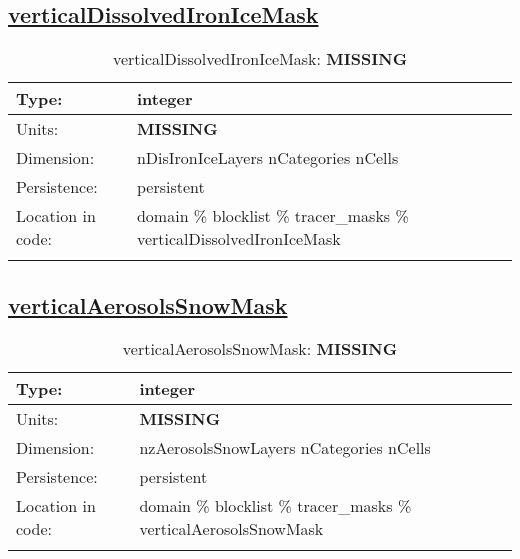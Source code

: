 \subsection[verticalDissolvedIronIceMask]{\hyperref[sec:var_tab_tracer_masks]{verticalDissolvedIronIceMask}}
\label{subsec:var_sec_tracer_masks_verticalDissolvedIronIceMask}
\begin{center}
\begin{longtable}{| p{2.0in} | p{4.0in} |}
        \hline 
        Type: & integer \\
        \hline 
        Units: & {\bf \color{red} MISSING} \\
        \hline 
        Dimension: & nDisIronIceLayers nCategories nCells \\
        \hline 
        Persistence: & persistent \\
        \hline 
         Location in code: & domain \% blocklist \% tracer\_masks \% verticalDissolvedIronIceMask \\
         \hline 
    \caption{verticalDissolvedIronIceMask: {\bf \color{red} MISSING}}
\end{longtable}
\end{center}
\subsection[verticalAerosolsSnowMask]{\hyperref[sec:var_tab_tracer_masks]{verticalAerosolsSnowMask}}
\label{subsec:var_sec_tracer_masks_verticalAerosolsSnowMask}
\begin{center}
\begin{longtable}{| p{2.0in} | p{4.0in} |}
        \hline 
        Type: & integer \\
        \hline 
        Units: & {\bf \color{red} MISSING} \\
        \hline 
        Dimension: & nzAerosolsSnowLayers nCategories nCells \\
        \hline 
        Persistence: & persistent \\
        \hline 
         Location in code: & domain \% blocklist \% tracer\_masks \% verticalAerosolsSnowMask \\
         \hline 
    \caption{verticalAerosolsSnowMask: {\bf \color{red} MISSING}}
\end{longtable}
\end{center}
